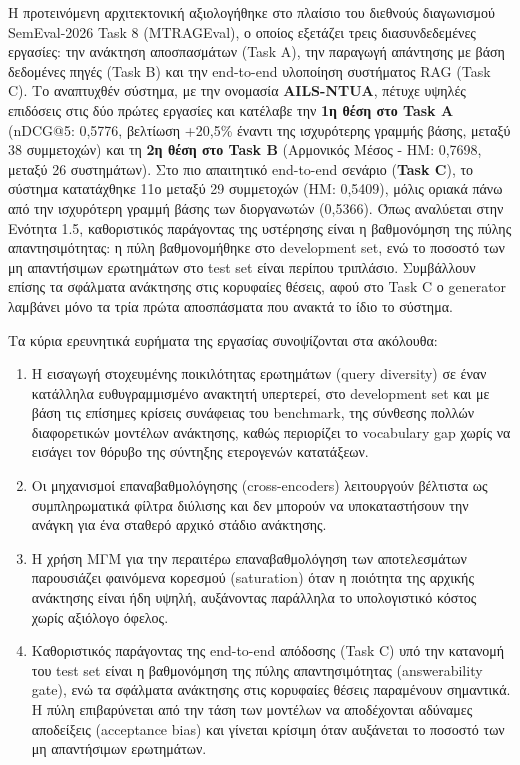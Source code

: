 Η προτεινόμενη αρχιτεκτονική αξιολογήθηκε στο πλαίσιο του διεθνούς διαγωνισμού SemEval-2026 Task 8 (MTRAGEval), ο οποίος εξετάζει τρεις διασυνδεδεμένες εργασίες: την ανάκτηση αποσπασμάτων (Task A), την παραγωγή απάντησης με βάση δεδομένες πηγές (Task B) και την end-to-end υλοποίηση συστήματος RAG (Task C). Το αναπτυχθέν σύστημα, με την ονομασία \textbf{AILS-NTUA}, πέτυχε υψηλές επιδόσεις στις δύο πρώτες εργασίες και κατέλαβε την \textbf{1η θέση στο Task A} (nDCG@5: 0,5776, βελτίωση +20,5\% έναντι της ισχυρότερης γραμμής βάσης, μεταξύ 38 συμμετοχών) και τη \textbf{2η θέση στο Task B} (Αρμονικός Μέσος - HM: 0,7698, μεταξύ 26 συστημάτων). Στο πιο απαιτητικό end-to-end σενάριο (\textbf{Task C}), το σύστημα κατατάχθηκε 11ο μεταξύ 29 συμμετοχών (HM: 0,5409), μόλις οριακά πάνω από την ισχυρότερη γραμμή βάσης των διοργανωτών (0,5366). Όπως αναλύεται στην Ενότητα 1.5, καθοριστικός παράγοντας της υστέρησης είναι η βαθμονόμηση της πύλης απαντησιμότητας: η πύλη βαθμονομήθηκε στο development set, ενώ το ποσοστό των μη απαντήσιμων ερωτημάτων στο test set είναι περίπου τριπλάσιο. Συμβάλλουν επίσης τα σφάλματα ανάκτησης στις κορυφαίες θέσεις, αφού στο Task C ο generator λαμβάνει μόνο τα τρία πρώτα αποσπάσματα που ανακτά το ίδιο το σύστημα.

Τα κύρια ερευνητικά ευρήματα της εργασίας συνοψίζονται στα ακόλουθα:
\begin{enumerate}
    \item Η εισαγωγή στοχευμένης ποικιλότητας ερωτημάτων (query diversity) σε έναν κατάλληλα ευθυγραμμισμένο ανακτητή υπερτερεί, στο development set και με βάση τις επίσημες κρίσεις συνάφειας του benchmark, της σύνθεσης πολλών διαφορετικών μοντέλων ανάκτησης, καθώς περιορίζει το vocabulary gap χωρίς να εισάγει τον θόρυβο της σύντηξης ετερογενών κατατάξεων.
    \item Οι μηχανισμοί επαναβαθμολόγησης (cross-encoders) λειτουργούν βέλτιστα ως συμπληρωματικά φίλτρα διύλισης και δεν μπορούν να υποκαταστήσουν την ανάγκη για ένα σταθερό αρχικό στάδιο ανάκτησης.
    \item Η χρήση ΜΓΜ για την περαιτέρω επαναβαθμολόγηση των αποτελεσμάτων παρουσιάζει φαινόμενα κορεσμού (saturation) όταν η ποιότητα της αρχικής ανάκτησης είναι ήδη υψηλή, αυξάνοντας παράλληλα το υπολογιστικό κόστος χωρίς αξιόλογο όφελος.
    \item Καθοριστικός παράγοντας της end-to-end απόδοσης (Task C) υπό την κατανομή του test set είναι η βαθμονόμηση της πύλης απαντησιμότητας (answerability gate), ενώ τα σφάλματα ανάκτησης στις κορυφαίες θέσεις παραμένουν σημαντικά. Η πύλη επιβαρύνεται από την τάση των μοντέλων να αποδέχονται αδύναμες αποδείξεις (acceptance bias) και γίνεται κρίσιμη όταν αυξάνεται το ποσοστό των μη απαντήσιμων ερωτημάτων.
\end{enumerate}

